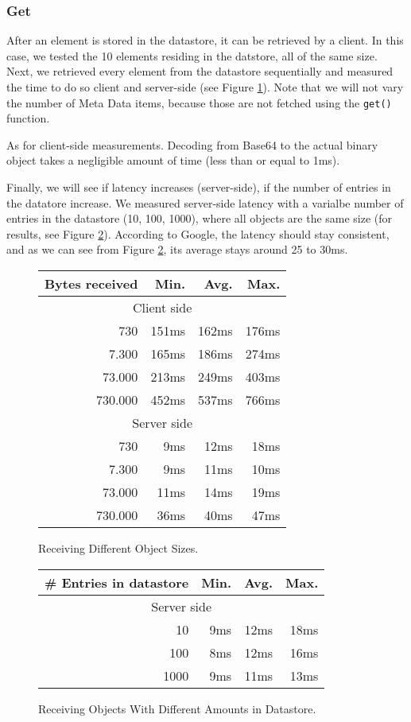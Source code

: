 \subsubsection{Get}
After an element is stored in the datastore, it can be retrieved by a client.
In this case, we tested the 10 elements residing in the datstore, all of the
same size. Next, we retrieved every element from the datastore sequentially and
measured the time to do so client and server-side (see Figure
\ref{get-obj-size}). Note that we will not vary the number of Meta Data items,
because those are not fetched using the \texttt{get()} function.

As for client-side measurements. Decoding from Base64 to the actual binary
object takes a negligible amount of time (less than or equal to 1ms).

Finally, we will see if latency increases (server-side), if the number of
entries in the datatore increase. We measured server-side latency with a
varialbe number of entries in the datastore (10, 100, 1000), where all objects
are the same size (for results, see Figure \ref{get-obj-amt}). According to
Google, the latency should stay consistent, and as we can see from Figure
\ref{get-obj-amt}, its average stays around 25 to 30ms.

\begin{figure}
\begin{tabular}{|r|r|r|r|}
\hline
Bytes received & Min. & Avg. & Max. \\
\hline
\multicolumn{4}{|c|}{Client side} \\
\hline
730 & 151ms & 162ms & 176ms \\
7.300 & 165ms & 186ms & 274ms \\
73.000 & 213ms & 249ms & 403ms \\
730.000 & 452ms & 537ms & 766ms \\
\hline
\multicolumn{4}{|c|}{Server side} \\
\hline
730 & 9ms & 12ms & 18ms \\
7.300 & 9ms & 11ms & 10ms \\
73.000 & 11ms & 14ms & 19ms \\
730.000 & 36ms & 40ms & 47ms \\
\hline
\end{tabular}
\caption{Receiving Different Object Sizes. \label{get-obj-size}}
\end{figure}

\begin{figure}
\begin{tabular}{|r|r|r|r|}
\hline
\# Entries in datastore & Min. & Avg. & Max. \\
\hline
\multicolumn{4}{|c|}{Server side} \\
\hline
10 & 9ms & 12ms & 18ms \\
100 & 8ms & 12ms & 16ms \\
1000 & 9ms & 11ms & 13ms \\
\hline
\end{tabular}
\caption{Receiving Objects With Different Amounts in Datastore.
\label{get-obj-amt}}
\end{figure}

